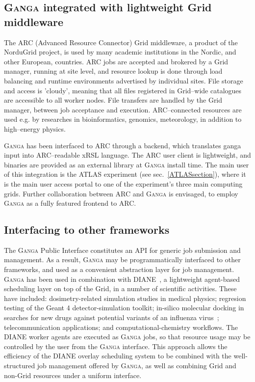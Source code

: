\documentclass{elsart}
\def\ganga {\textsc{Ganga}\xspace}
\def\diane {\textsc{DIANE}\xspace}
\def\grid {Grid\xspace}
\begin{document}
\subsection{\ganga integrated with lightweight \grid middleware}

The ARC (Advanced Resource Connector) \grid middleware\cite{ARC}, a
product of the NorduGrid project\cite{NorduGrid}, is used by many academic
institutions in the Nordic, and other European, countries. ARC jobs are accepted and
brokered by a \grid manager, running at site level, and resource lookup
is done through load balancing and runtime environments advertised by
individual sites. File storage and access is 'cloudy', meaning that
all files registered in \grid--wide catalogues are accessible to all
worker nodes. File transfers are handled by the \grid manager, between
job acceptance and execution. ARC--connected resources are used
e.g. by researches in bioinformatics, genomics, meteorology, in
addition to high--energy physics.

\ganga has been interfaced to ARC through a backend, which translates
ganga input into ARC--readable xRSL language. The ARC user client is
lightweight, and binaries are provided as an external library at \ganga
install time. The main user of this integration is the ATLAS
experiment (see sec.~\ref{ATLASsection}), where it is the main user
access portal to one of the experiment's three main computing
grids. Further collaboration between ARC and \ganga is envisaged, to
employ \ganga as a fully featured frontend to ARC.

\subsection{Interfacing to other frameworks}
\label{sec:GangaInOtherFrameworks}
The \ganga Public Interface constitutes an API for generic job submission
and management.  As a result, \ganga may be programmatically
interfaced to other frameworks, and used as a convenient abstraction layer for
job management. \ganga has been used in combination with \diane~\cite{DIANE},
a lightweight agent-based
scheduling layer on top of the \grid, in a number
of scientific activities.  These have included: dosimetry-related simulation
studies in medical physics; regresion testing of the Geant 4 \cite{Geant4}
detector-simulation toolkit;
in-silico molecular docking in searches for 
new drugs against potential variants of an influenza virus~\cite{AvianFlu};
telecommunication applications; and computational-chemistry workflows. The
\diane worker agents are executed as \ganga jobs, so that resource usage
may be controlled by the user from the \ganga interface. This
approach allows the efficiency of the \diane overlay scheduling system
to be combined with the well-structured job management offered by \ganga, as well as
combining \grid and non-\grid resources under a uniform interface.
\end{document}
